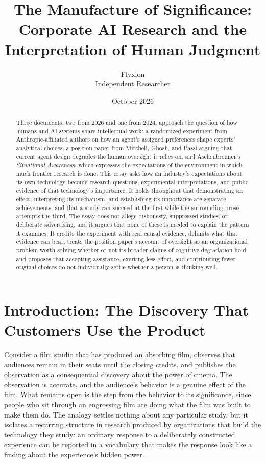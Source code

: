 \documentclass[11pt]{article}
\title{The Manufacture of Significance:\\Corporate AI Research and the Interpretation of Human Judgment}
\author{Flyxion\\Independent Researcher}
\date{October 2026}
\begin{document}
\maketitle

\begin{abstract}
\noindent Three documents, two from 2026 and one from 2024, approach the question of how humans and AI systems share intellectual work: a randomized experiment from Anthropic-affiliated authors on how an agent's assigned preferences shape experts' analytical choices, a position paper from Mitchell, Ghosh, and Passi arguing that current agent design degrades the human oversight it relies on, and Aschenbrenner's \emph{Situational Awareness}, which expresses the expectations of the environment in which much frontier research is done. This essay asks how an industry's expectations about its own technology become research questions, experimental interpretations, and public evidence of that technology's importance. It holds throughout that demonstrating an effect, interpreting its mechanism, and establishing its importance are separate achievements, and that a study can succeed at the first while the surrounding prose attempts the third. The essay does not allege dishonesty, suppressed studies, or deliberate advertising, and it argues that none of these is needed to explain the pattern it examines. It credits the experiment with real causal evidence, delimits what that evidence can bear, treats the position paper's account of oversight as an organizational problem worth solving whether or not its broader claims of cognitive degradation hold, and proposes that accepting assistance, exerting less effort, and contributing fewer original choices do not individually settle whether a person is thinking well.
\end{abstract}

\section{Introduction: The Discovery That Customers Use the Product}

Consider a film studio that has produced an absorbing film, observes that audiences remain in their seats until the closing credits, and publishes the observation as a consequential discovery about the power of cinema. The observation is accurate, and the audience's behavior is a genuine effect of the film. What remains open is the step from the behavior to its significance, since people who sit through an engrossing film are doing what the film was built to make them do. The analogy settles nothing about any particular study, but it isolates a recurring structure in research produced by organizations that build the technology they study: an ordinary response to a deliberately constructed experience can be reported in a vocabulary that makes the response look like a finding about the experience's hidden power.
\end{document}
